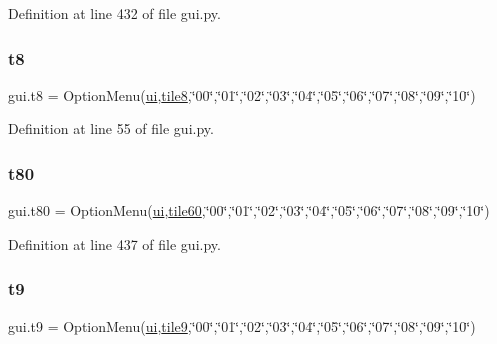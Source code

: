 Definition at line 432 of file gui.\+py.

\mbox{\label{namespacegui_a589dfadd3354277e8adee92e5bb28ea0}} 
\subsubsection{\texorpdfstring{t8}{t8}}
{\footnotesize\ttfamily gui.\+t8 = Option\+Menu(\mbox{\hyperlink{namespacegui_a40ab7281456eadbea2dc2038f5c24fa1}{ui}},\mbox{\hyperlink{namespacegui_a65c29dc3a8945c02e5d60af809bdc770}{tile8}},\char`\"{}00\char`\"{},\char`\"{}01\char`\"{},\char`\"{}02\char`\"{},\char`\"{}03\char`\"{},\char`\"{}04\char`\"{},\char`\"{}05\char`\"{},\char`\"{}06\char`\"{},\char`\"{}07\char`\"{},\char`\"{}08\char`\"{},\char`\"{}09\char`\"{},\char`\"{}10\char`\"{})}



Definition at line 55 of file gui.\+py.

\mbox{\label{namespacegui_af0f90832c31c273f023dac997bfee922}} 
\subsubsection{\texorpdfstring{t80}{t80}}
{\footnotesize\ttfamily gui.\+t80 = Option\+Menu(\mbox{\hyperlink{namespacegui_a40ab7281456eadbea2dc2038f5c24fa1}{ui}},\mbox{\hyperlink{namespacegui_ab03da7520cb8fba94a7355a29961a27c}{tile60}},\char`\"{}00\char`\"{},\char`\"{}01\char`\"{},\char`\"{}02\char`\"{},\char`\"{}03\char`\"{},\char`\"{}04\char`\"{},\char`\"{}05\char`\"{},\char`\"{}06\char`\"{},\char`\"{}07\char`\"{},\char`\"{}08\char`\"{},\char`\"{}09\char`\"{},\char`\"{}10\char`\"{})}



Definition at line 437 of file gui.\+py.

\mbox{\label{namespacegui_a17f3c9bcfa975e93fed3849a82a3313f}} 
\subsubsection{\texorpdfstring{t9}{t9}}
{\footnotesize\ttfamily gui.\+t9 = Option\+Menu(\mbox{\hyperlink{namespacegui_a40ab7281456eadbea2dc2038f5c24fa1}{ui}},\mbox{\hyperlink{namespacegui_a004a4a87f02c662204894326ad5e410f}{tile9}},\char`\"{}00\char`\"{},\char`\"{}01\char`\"{},\char`\"{}02\char`\"{},\char`\"{}03\char`\"{},\char`\"{}04\char`\"{},\char`\"{}05\char`\"{},\char`\"{}06\char`\"{},\char`\"{}07\char`\"{},\char`\"{}08\char`\"{},\char`\"{}09\char`\"{},\char`\"{}10\char`\"{})}



